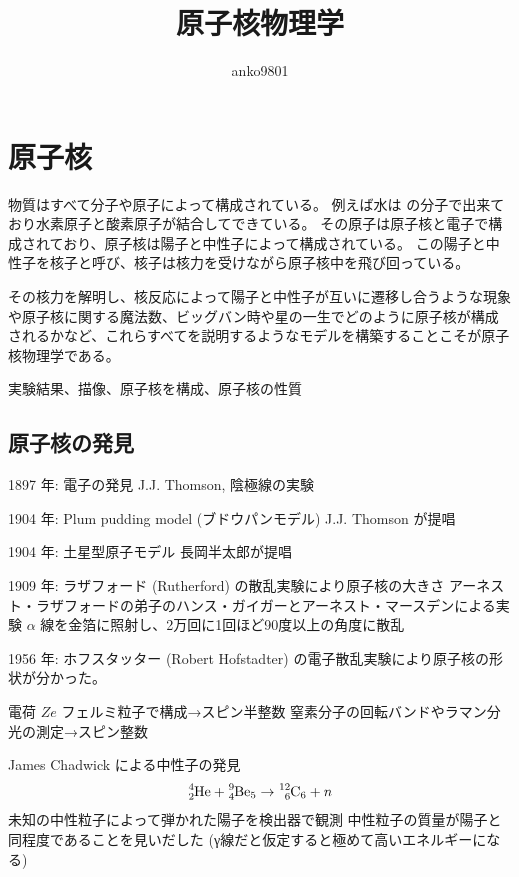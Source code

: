 \documentclass[uplatex,dvipdfmx,a4paper,11pt]{jlreq}
\title{原子核物理学}
\author{anko9801}
\numberwithin{equation}{section}
\theoremstyle{definition}
\begin{document}
\maketitle
\tableofcontents
\clearpage

\section{原子核}
物質はすべて分子や原子によって構成されている。
例えば水は  の分子で出来ており水素原子と酸素原子が結合してできている。
その原子は原子核と電子で構成されており、原子核は陽子と中性子によって構成されている。
この陽子と中性子を核子と呼び、核子は核力を受けながら原子核中を飛び回っている。

その核力を解明し、核反応によって陽子と中性子が互いに遷移し合うような現象や原子核に関する魔法数、ビッグバン時や星の一生でどのように原子核が構成されるかなど、これらすべてを説明するようなモデルを構築することこそが原子核物理学である。

実験結果、描像、原子核を構成、原子核の性質

\subsection{原子核の発見}
1897 年: 電子の発見 J.J. Thomson, 陰極線の実験

1904 年: Plum pudding model (ブドウパンモデル) J.J. Thomson が提唱

1904 年: 土星型原子モデル 長岡半太郎が提唱

1909 年: ラザフォード (Rutherford) の散乱実験により原子核の大きさ
アーネスト・ラザフォードの弟子のハンス・ガイガーとアーネスト・マースデンによる実験
$\alpha$ 線を金箔に照射し、2万回に1回ほど90度以上の角度に散乱

1956 年: ホフスタッター (Robert Hofstadter) の電子散乱実験により原子核の形状が分かった。

電荷 $Ze$
フェルミ粒子で構成→スピン半整数
窒素分子の回転バンドやラマン分光の測定→スピン整数

James Chadwick による中性子の発見
\begin{align}
  \ce{^4_2He} + \ce{^9_4Be_5} \to \ce{^12_6C_6} + n
\end{align}
未知の中性粒子によって弾かれた陽子を検出器で観測
中性粒子の質量が陽子と同程度であることを見いだした
(γ線だと仮定すると極めて高いエネルギーになる)
\end{document}
